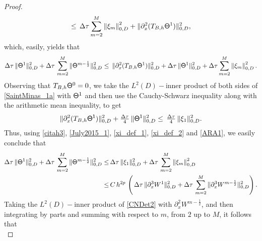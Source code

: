 \documentclass[10pt]{amsart}
\numberwithin{equation}{section}
\begin{document}
\begin{proof}
\begin{equation*}
\leq\,{\Delta\tau}\sum_{m=2}^{{\scriptscriptstyle} M}\left\|\xi_m\right\|_{{\scriptscriptstyle} 0,D}^2
+\|\partial_x^2(T_{{\scriptscriptstyle} B,h}{\sf\Theta}^{1})\|_{{\scriptscriptstyle} 0,D}^2,
\end{equation*}
which, easily, yields that
\begin{equation}\label{citah3}
{\Delta\tau}\,\|{\sf\Theta}^1\|_{{\scriptscriptstyle} 0,D}^2
+{\Delta\tau}\,\sum_{m=2}^{{\scriptscriptstyle} M}\|{\sf\Theta}^{m-\frac{1}{2}}\|_{{\scriptscriptstyle} 0,D}^2
\leq\,\|\partial_x^2(T_{{\scriptscriptstyle} B,h}{\sf\Theta}^{1})\|_{{\scriptscriptstyle} 0,D}^2
+{\Delta\tau}\,\|{\sf\Theta}^1\|^2_{{\scriptscriptstyle} 0,D}
+{\Delta\tau}\sum_{m=2}^{{\scriptscriptstyle} M}\left\|\xi_m\right\|_{{\scriptscriptstyle} 0,D}^2.
\end{equation}
Observing that $T_{{\scriptscriptstyle} B,h}{\sf\Theta}^0=0$, we
take the $L^2(D)-$inner product of both sides of
\eqref{SaintMinas_1a} with ${\sf \Theta}^{1}$ and then 
use the Cauchy-Schwarz inequality  along with the arithmetic mean inequality, to get
\begin{equation}\label{July2015_1}
\|\partial_x^2(T_{{\scriptscriptstyle} B,h}{\sf\Theta^1})\|_{{\scriptscriptstyle} 0,D}^2+\tfrac{\Delta\tau}{4}\,
\|{\sf\Theta^1}\|^2_{{\scriptscriptstyle} 0,D}\leq\,\tfrac{\Delta\tau}{4}\,\|\xi_1\|_{{\scriptscriptstyle} 0,D}^2.
\end{equation}
Thus, using \eqref{citah3}, \eqref{July2015_1},
\eqref{xi_def_1}, \eqref{xi_def_2} and \eqref{ARA1},
we easily conclude that
\begin{equation}\label{July2015_2}
\begin{split}
{\Delta\tau}\,\|{\sf\Theta}^1\|_{{\scriptscriptstyle} 0,D}^2
+{\Delta\tau}\,\sum_{m=2}^{{\scriptscriptstyle} M}\|{\sf\Theta}^{m-\frac{1}{2}}\|_{{\scriptscriptstyle} 0,D}^2
\leq&\,{\Delta\tau}\,\|\xi_1\|_{{\scriptscriptstyle} 0,D}^2
+{\Delta\tau}\,\sum_{m=2}^{{\scriptscriptstyle} M}\left\|\xi_m\right\|_{{\scriptscriptstyle} 0,D}^2\\
\leq&\,C\,h^{2p}\,\left(\,{\Delta\tau}\,\|\partial^3_xW^1\|^2_{{\scriptscriptstyle} 0,D}
+{\Delta\tau}\,\sum_{m=2}^{{\scriptscriptstyle} M} 
\|\partial_x^3W^{m-\frac{1}{2}}\|_{{\scriptscriptstyle} 0,D}^2\right).
\end{split}
\end{equation}
Taking the $L^2(D)-$inner product of \eqref{CNDet2} with
$\partial_x^2W^{m-\frac{1}{2}}$,
and then integrating by parts and summing with respect to $m$,
from $2$ up to $M$, it follows that
\begin{equation*}

\end{equation*}
\end{proof}
\end{document}
